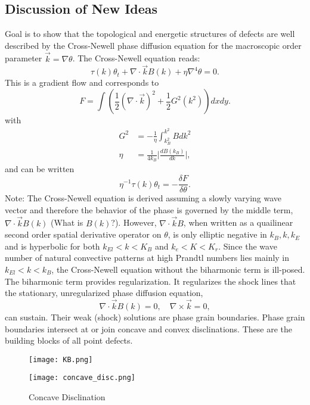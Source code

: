 \documentclass[12pt]{article}
\newcounter{solution}
\begin{document}
\subsection{Discussion of New Ideas}
Goal is to show that the topological and energetic structures of defects are well described by the Cross-Newell phase diffusion equation for the macroscopic order parameter $\vec{k}=\nabla \theta$.
    The Cross-Newell equation reads:
    \[
        \tau(k)\theta_t + \nabla \cdot \vec{k}B(k) + \eta \nabla^4 \theta = 0.
    \] 
    This is a gradient flow and corresponds to
     \[
        F = \int \left( \frac{1}{2}(\nabla \cdot \vec{k})^2 + \frac{1}{2}G^2(k^2) \right)dxdy.
    \] 
    with
    \begin{align*}
        G^2 &= -\frac{1}{\eta}\int_{k_B^2}^{k^2}Bdk^2\\
        \eta &= \frac{1}{4k_B}\lvert \frac{dB(k_B)}{dk}\rvert,
    \end{align*}
    and can be written
    \[
        \eta^{-1}\tau(k)\theta_t = -\frac{\delta F}{\delta \theta}.
    \]
    Note: The Cross-Newell equation is derived assuming a slowly varying wave vector and therefore the behavior of the phase is governed by the middle term, $\nabla \cdot \vec{k}B(k)$ (What is $B(k)$?).
    However, $\nabla \cdot \vec{k}B$, when written as a quailinear second order spatial derivative operator on $\theta$, is only elliptic negative in $k_B , k , k_E$ and is hyperbolic for both $k_{El}<k<K_B$ and $k_e<K<K_r$. Since the wave number of natural convective patterns at high Prandtl numbers lies mainly in $k_{El}<k<k_B$, the Cross-Newell equation without the biharmonic term is ill-posed. The biharmonic term provides regularization. It regularizes the shock lines that the stationary, unregularized phase diffusion equation,
    \[
        \nabla \cdot \vec{k}B(k)=0, \quad \nabla \times \vec{k}=0,
    \] 
    can sustain. Their weak (shock) solutions are phase grain boundaries. \newline
\hspace*{10mm} Phase grain boundaries intersect at or join concave and convex disclinations. These are the building blocks of all point defects. 

\begin{figure}[ht]
        \centering
        \texttt{[image: KB.png]}
        \label{fig:1}
    \end{figure}

   \begin{figure}[ht]
        \centering
        \texttt{[image: concave\_disc.png]}
        \caption{Concave Disclination}
        \label{fig:2}
    \end{figure}
\end{document}
